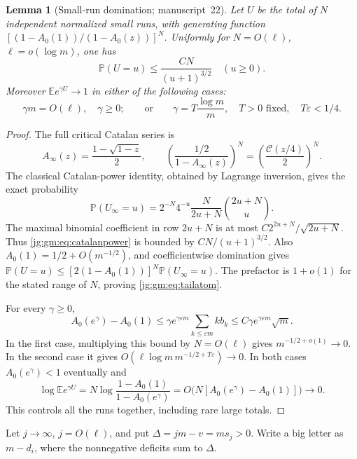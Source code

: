 \documentclass[11pt,a4paper]{article}
\newtheorem{lemma}[lemma]{Lemma}
\theoremstyle{definition}\newaliascnt{definition}{theorem}
\theoremstyle{remark}\newaliascnt{remark}{theorem}
\newcommand{\Cat}{\mathcal C}
\newcommand{\ljP}{\mathbb P}
\newcommand{\ljE}{\mathbb E}
\begin{document}
\begin{lemma}[Small-run domination; manuscript~22]\label{jg:gm:lem:runs}
Let $U$ be the total of $N$ independent normalized small runs, with generating
function $[(1-A_0(1))/(1-A_0(z))]^N$. Uniformly for $N=O(\ell)$,
$\ell=o(\log m)$, one has
\begin{equation}\label{jg:gm:eq:tailatom}
 \ljP(U=u)\le\frac{CN}{(u+1)^{3/2}}\quad(u\ge0).
\end{equation}
Moreover $\ljE e^{\gamma U}\to1$ in either of the following cases:
\[
 \gamma m=O(\ell),\quad\gamma\ge0;
 \qquad\text{or}\qquad
 \gamma=T\frac{\log m}{m},\quad T>0\text{ fixed},\quad T\varepsilon<1/4.
\]
\end{lemma}
\begin{proof}
The full critical Catalan series is
\[
 A_\infty(z)=\frac{1-\sqrt{1-z}}2,\qquad
 \left(\frac{1/2}{1-A_\infty(z)}\right)^N
      =\left(\frac{\Cat(z/4)}2\right)^N .
\]
The classical Catalan-power identity, obtained by Lagrange inversion, gives the
exact probability
\begin{equation}\label{jg:gm:eq:catalanpower}
 \ljP(U_\infty=u)
 =2^{-N}4^{-u}\frac{N}{2u+N}\binom{2u+N}{u}.
\end{equation}
The maximal binomial coefficient in row $2u+N$ is at most
$C2^{2u+N}/\sqrt{2u+N}$. Thus \eqref{jg:gm:eq:catalanpower} is bounded by
$CN/(u+1)^{3/2}$. Also $A_0(1)=1/2+O(m^{-1/2})$, and coefficientwise
domination gives $\ljP(U=u)\le[2(1-A_0(1))]^N\ljP(U_\infty=u)$. The prefactor
is $1+o(1)$ for the stated range of $N$, proving \eqref{jg:gm:eq:tailatom}.

For every $\gamma\ge0$,
\begin{equation}\label{jg:gm:eq:runmgf}
 A_0(e^\gamma)-A_0(1)
 \le \gamma e^{\gamma\varepsilon m}
                \sum_{k\le\varepsilon m}kb_k
 \le C\gamma e^{\gamma\varepsilon m}\sqrt m.
\end{equation}
In the first case, multiplying this bound by $N=O(\ell)$ gives
$m^{-1/2+o(1)}\to0$. In the second case it gives
$O(\ell\log m\,m^{-1/2+T\varepsilon})\to0$. In both cases $A_0(e^\gamma)<1$
eventually and
\[
 \log\ljE e^{\gamma U}
 =N\log\frac{1-A_0(1)}{1-A_0(e^\gamma)}
 =O\bigl(N[A_0(e^\gamma)-A_0(1)]\bigr)\to0.
\]
This controls all the runs together, including rare large totals.
\end{proof}

Let $j\to\infty$, $j=O(\ell)$, and put $\Delta=jm-v=ms_j>0$. Write a big letter
as $m-d_i$, where the nonnegative deficits sum to $\Delta$.
\end{document}
